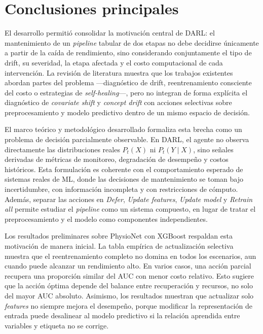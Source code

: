 
\section*{Conclusiones principales}

El desarrollo permitió consolidar la motivación central de DARL:
el mantenimiento de un \textit{pipeline} tabular de dos etapas no debe decidirse
únicamente a partir de la caída de rendimiento, sino considerando conjuntamente
el tipo de drift, su severidad, la etapa afectada y el costo computacional de
cada intervención. La revisión de literatura muestra que los trabajos existentes
abordan partes del problema ---diagnóstico de drift, reentrenamiento consciente
del costo o estrategias de \textit{self-healing}---, pero no integran de forma
explícita el diagnóstico de \textit{covariate shift} y \textit{concept drift}
con acciones selectivas sobre preprocesamiento y modelo predictivo dentro de un
mismo espacio de decisión.

El marco teórico y metodológico desarrollado formaliza esta brecha como un
problema de decisión parcialmente observable. En DARL, el agente no observa
directamente las distribuciones reales $P_t(X)$ ni $P_t(Y \mid X)$, sino señales
derivadas de métricas de monitoreo, degradación de desempeño y costos históricos.
Esta formulación es coherente con el comportamiento esperado de sistemas reales
de ML, donde las decisiones de mantenimiento se toman bajo incertidumbre, con
información incompleta y con restricciones de cómputo. Además, separar las
acciones en \textit{Defer}, \textit{Update features}, \textit{Update model} y
\textit{Retrain all} permite estudiar el \textit{pipeline} como un sistema
compuesto, en lugar de tratar el preprocesamiento y el modelo como componentes
independientes.

Los resultados preliminares sobre PhysioNet con XGBoost respaldan esta
motivación de manera inicial. La tabla empírica de actualización selectiva
muestra que el reentrenamiento completo no domina en todos los escenarios, aun
cuando puede alcanzar un rendimiento alto. En varios casos, una acción parcial
recupera una proporción similar del AUC con menor costo relativo. Esto sugiere
que la acción óptima depende del balance entre recuperación y recursos, no solo
del mayor AUC absoluto. Asimismo, los resultados muestran que actualizar solo
\textit{features} no siempre mejora el desempeño, porque modificar la
representación de entrada puede desalinear al modelo predictivo si la relación
aprendida entre variables y etiqueta no se corrige.

